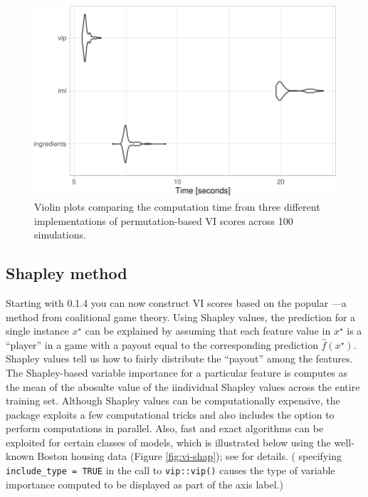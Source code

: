 \begin{Schunk}
\begin{figure}[!htb]

{\centering \includegraphics[width=0.7\linewidth]{greenwell-boehmke_files/figure-latex/benchmark-1} 

}

\caption[Violin plots comparing the computation time from three different implementations of permutation-based VI scores across 100 simulations]{Violin plots comparing the computation time from three different implementations of permutation-based VI scores across 100 simulations.}\label{fig:benchmark}
\end{figure}
\end{Schunk}

\subsection{Shapley method}

Starting with  0.1.4 you can now construct VI scores based on
the popular 
\citet[Chapter 5, Section 5.9]{molnar-2019-iml}---a method from
coalitional game theory. Using Shapley values, the prediction for a
single instance \(x^\star\) can be explained by assuming that each
feature value in \(x^\star\) is a ``player'' in a game with a payout
equal to the corresponding prediction
\(\widehat{f}\left(x^\star\right)\). Shapley values tell us how to
fairly distribute the ``payout'' among the features. The Shapley-based
variable importance for a particular feature is computes as the mean of
the abosulte value of the iindividual Shapley values across the entire
training set. Although Shapley values can be computationally expensive,
the  package \citep{fastshap-pkg} exploits a few
computational tricks and also includes the option to perform
computations in parallel. Also, fast and exact algorithms
\citep{lundberg-explainable-2019} can be exploited for certain classes
of models, which is illustrated below using the well-known Boston
housing data (Figure \ref{fig:vi-shap}); see 
for details. ( specifying \texttt{include\_type\ =\ TRUE}
in the call to \texttt{vip::vip()} causes the type of variable
importance computed to be displayed as part of the axis label.)

